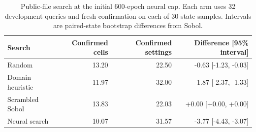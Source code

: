 \begin{table}[htbp]
\centering\small
\caption{Public-file search at the initial 600-epoch neural cap. Each arm uses 32 development queries and fresh confirmation on each of 30 state samples. Intervals are paired-state bootstrap differences from Sobol.}
\label{tab:public-search}
\begin{tabular}{lrrr}
\toprule
Search & Confirmed cells & Confirmed settings & Difference [95\% interval] \\
\midrule
Random & 13.20 & 22.50 & -0.63 [-1.23, -0.03] \\
Domain heuristic & 11.97 & 32.00 & -1.87 [-2.37, -1.33] \\
Scrambled Sobol & 13.83 & 22.03 & +0.00 [+0.00, +0.00] \\
Neural search & 10.07 & 31.57 & -3.77 [-4.43, -3.07] \\
\bottomrule
\end{tabular}
\end{table}
